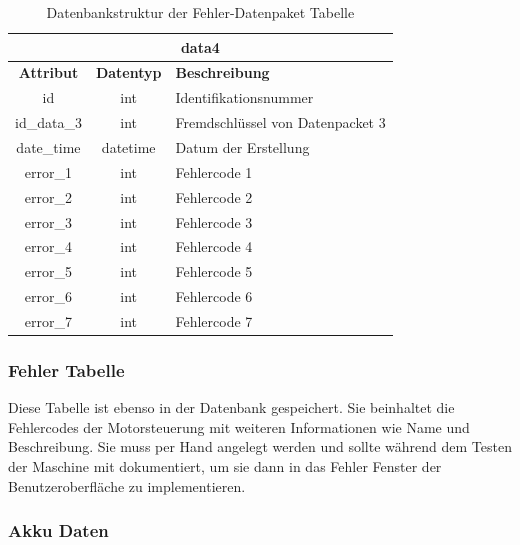 \begin{table}[H]
	\begin{center}
		\begin{tabular}{|c|c|l|}
			\hline
			\multicolumn{3}{|c|}{\textbf{data4}} \\ \hline
			\textbf{Attribut}           & \textbf{Datentyp} & \textbf{Beschreibung}                     \\ \hline
			id                          & int               & Identifikationsnummer                     \\ \hline
			id\_data\_3                 & int               & Fremdschlüssel von Datenpacket 3          \\ \hline
			date\_time                	& datetime          & Datum der Erstellung        				\\ \hline
			error\_1                 	& int	            & Fehlercode 1                      		\\ \hline
			error\_2            		& int               & Fehlercode 2            					\\ \hline
			error\_3        			& int               & Fehlercode 3       						\\ \hline
			error\_4           			& int               & Fehlercode 4       	 					\\ \hline
			error\_5    				& int               & Fehlercode 5 								\\ \hline
			error\_6					& int               & Fehlercode 6        						\\ \hline
			error\_7					& int               & Fehlercode 7    							\\ \hline
		\end{tabular}
		\caption{Datenbankstruktur der Fehler-Datenpaket Tabelle}
		\label{tab:data4}
	\end{center}
\end{table}

\subsubsection{Fehler Tabelle}

Diese Tabelle ist ebenso in der Datenbank gespeichert. Sie beinhaltet die Fehlercodes der Motorsteuerung mit weiteren Informationen wie Name und Beschreibung. Sie muss per Hand angelegt werden und sollte während dem Testen der Maschine mit dokumentiert, um sie dann in das Fehler Fenster der Benutzeroberfläche zu implementieren.

\subsubsection{Akku Daten}

